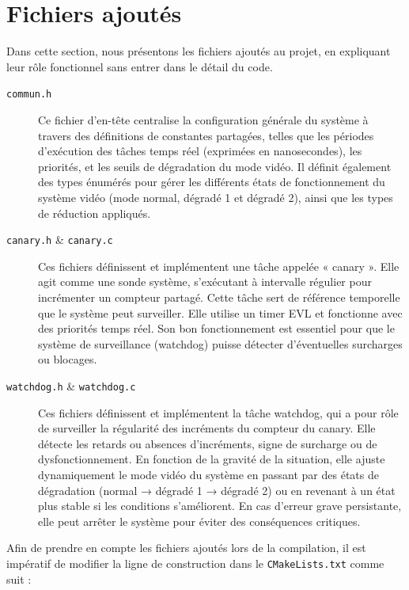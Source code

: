 \documentclass[a4paper,12pt]{article}
\begin{document}
\section{Fichiers ajoutés}

Dans cette section, nous présentons les fichiers ajoutés au projet, en expliquant leur rôle fonctionnel sans entrer dans le détail du code.

\begin{description}

  \item[\texttt{commun.h}]  
  Ce fichier d'en-tête centralise la configuration générale du système à travers des définitions de constantes partagées, telles que les périodes d’exécution des tâches temps réel (exprimées en nanosecondes), les priorités, et les seuils de dégradation du mode vidéo. Il définit également des types énumérés pour gérer les différents états de fonctionnement du système vidéo (mode normal, dégradé 1 et dégradé 2), ainsi que les types de réduction appliqués.

  \item[\texttt{canary.h} \& \texttt{canary.c}]  
  Ces fichiers définissent et implémentent une tâche appelée « canary ». Elle agit comme une sonde système, s’exécutant à intervalle régulier pour incrémenter un compteur partagé. Cette tâche sert de référence temporelle que le système peut surveiller. Elle utilise un timer EVL et fonctionne avec des priorités temps réel. Son bon fonctionnement est essentiel pour que le système de surveillance (watchdog) puisse détecter d’éventuelles surcharges ou blocages.

  \item[\texttt{watchdog.h} \& \texttt{watchdog.c}]  
  Ces fichiers définissent et implémentent la tâche watchdog, qui a pour rôle de surveiller la régularité des incréments du compteur du canary. Elle détecte les retards ou absences d'incréments, signe de surcharge ou de dysfonctionnement. En fonction de la gravité de la situation, elle ajuste dynamiquement le mode vidéo du système en passant par des états de dégradation (normal → dégradé 1 → dégradé 2) ou en revenant à un état plus stable si les conditions s'améliorent. En cas d’erreur grave persistante, elle peut arrêter le système pour éviter des conséquences critiques.

\end{description}

Afin de prendre en compte les fichiers ajoutés lors de la compilation, il est impératif de modifier la ligne de construction dans le \texttt{CMakeLists.txt} comme suit :
\end{document}
